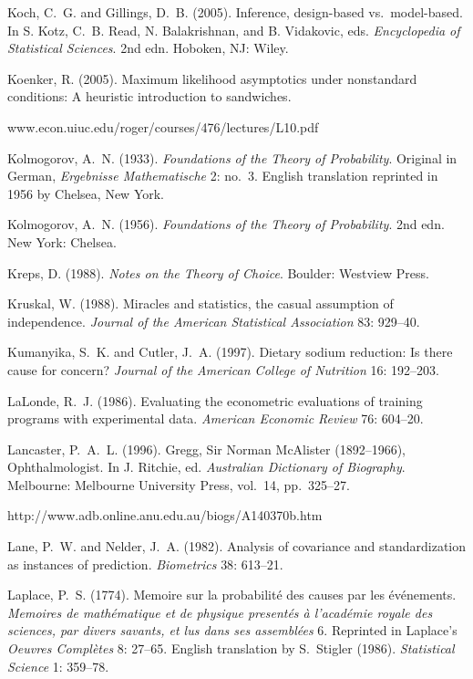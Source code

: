 \smallskip\noindent
Koch, C.~G. and Gillings, D.~B. (2005).
Inference, design-based vs.~model-based.
In S. Kotz, C.~B. Read, N. Balakrishnan, and B. Vidakovic, eds.
{\it Encyclopedia of Statistical Sciences\/}. 2nd edn.
Hoboken, NJ: Wiley.

\smallskip\noindent
Koenker, R. (2005).
Maximum likelihood asymptotics under nonstandard conditions:
A heuristic introduction to sandwiches.

\noindent\hskip 10pt{
www.econ.uiuc.edu/{\hbox{}}roger/courses/476/lectures/L10.pdf
}


\smallskip\noindent
Kolmogorov, A.~N. (1933).
{\it Foundations of the Theory of Probability\/}.
Original in German, {\it Ergebnisse Mathematische\/} 2: no.~3.
English translation reprinted in 1956 by Chelsea, New York.

\smallskip\noindent
Kolmogorov, A.~N. (1956).
{\it Foundations of the Theory of Probability\/}. 2nd edn.
New York: Chelsea.

\smallskip\noindent
Kreps, D. (1988).
{\it  Notes on the Theory of Choice\/}.
Boulder: Westview Press.

\smallskip\noindent
Kruskal, W. (1988).
Miracles and statistics, the casual assumption of independence.
{\it Journal of the American Statistical Association} 83: 929--40.

\smallskip\noindent
Kumanyika, S.~K. and Cutler, J.~A. (1997).
Dietary sodium reduction: Is there cause for concern?
{\it Journal of the American College of Nutrition\/} 16: 192--203.

\smallskip\noindent
LaLonde, R.~J. (1986).
Evaluating the econometric evaluations of training programs with experimental data.
{\it American Economic Review\/} 76: 604--20.

\smallskip\noindent
Lancaster, P.~A.~L. (1996).
Gregg, Sir Norman McAlister (1892--1966), Ophthalmologist.
In J. Ritchie, ed. {\it\/ Australian Dictionary of Biography\/}.
Melbourne: Melbourne University Press, vol.~14, pp.~325--27.

\noindent\hskip 10pt
http://www.adb.online.anu.edu.au/biogs/A140370b.htm

\smallskip\noindent
Lane, P.~W. and Nelder, J.~A. (1982).
Analysis of covariance and standardization as instances of prediction.
{\it Biometrics\/} {38}: 613--21.

\smallskip\noindent
Laplace, P.~S. (1774).
Memoire sur la probabilit\'e des causes par les \'ev\'ene\-ments.
{\it Memoires de math\'ematique et de physique present\'es \`a l'acad\'emie
royale des sciences,
par divers savants, et lus dans ses assembl\'ees\/} 6.
Re\-printed in Laplace's {\it Oeuvres Compl\`etes\/} 8: 27--65.
English translation by S.~Stigler (1986).
{\it Statistical Science\/} 1: 359--78.

